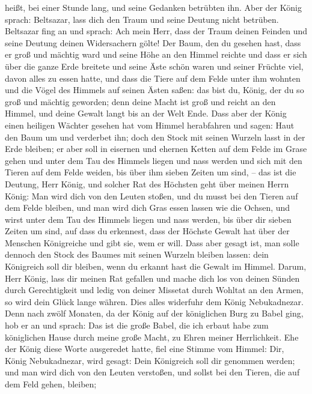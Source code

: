 heißt, bei einer Stunde lang, und seine Gedanken betrübten ihn. Aber der
König sprach: Beltsazar, lass dich den Traum und seine Deutung nicht
betrüben. Beltsazar fing an und sprach: Ach mein Herr, dass der Traum
deinen Feinden und seine Deutung deinen Widersachern gölte!
 Der Baum, den du gesehen hast, dass er groß und mächtig
ward und seine Höhe an den Himmel reichte und dass er sich über die
ganze Erde breitete  und seine Äste schön waren und seiner
Früchte viel, davon alles zu essen hatte, und dass die Tiere auf dem
Felde unter ihm wohnten und die Vögel des Himmels auf seinen Ästen
saßen:  das bist du, König, der du so groß und mächtig
geworden; denn deine Macht ist groß und reicht an den Himmel, und deine
Gewalt langt bis an der Welt Ende.  Dass aber der König
einen heiligen Wächter gesehen hat vom Himmel herabfahren und sagen:
Haut den Baum um und verderbet ihn; doch den Stock mit seinen Wurzeln
lasst in der Erde bleiben; er aber soll in eisernen und ehernen Ketten
auf dem Felde im Grase gehen und unter dem Tau des Himmels liegen und
nass werden und sich mit den Tieren auf dem Felde weiden, bis über ihm
sieben Zeiten um sind, --  das ist die Deutung, Herr König,
und solcher Rat des Höchsten geht über meinen Herrn König: 
Man wird dich von den Leuten stoßen, und du musst bei den Tieren auf dem
Felde bleiben, und man wird dich Gras essen lassen wie die Ochsen, und
wirst unter dem Tau des Himmels liegen und nass werden, bis über dir
sieben Zeiten um sind, auf dass du erkennest, dass der Höchste Gewalt
hat über der Menschen Königreiche und gibt sie, wem er will.
 Dass aber gesagt ist, man solle dennoch den Stock des
Baumes mit seinen Wurzeln bleiben lassen: dein Königreich soll dir
bleiben, wenn du erkannt hast die Gewalt im Himmel.  Darum,
Herr König, lass dir meinen Rat gefallen und mache dich los von deinen
Sünden durch Gerechtigkeit und ledig von deiner Missetat durch Wohltat
an den Armen, so wird dein Glück lange währen.  Dies alles
widerfuhr dem König Nebukadnezar.  Denn nach zwölf Monaten,
da der König auf der königlichen Burg zu Babel ging,  hob
er an und sprach: Das ist die große Babel, die ich erbaut habe zum
königlichen Hause durch meine große Macht, zu Ehren meiner Herrlichkeit.
 Ehe der König diese Worte ausgeredet hatte, fiel eine
Stimme vom Himmel: Dir, König Nebukadnezar, wird gesagt: Dein Königreich
soll dir genommen werden;  und man wird dich von den Leuten
verstoßen, und sollst bei den Tieren, die auf dem Feld gehen, bleiben;
